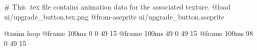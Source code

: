 # This .tex file contains animation data for the associated texture.
@load ui/upgrade_button.tex.png
@from-aseprite ui/upgrade_button.aseprite

@anim loop
	@frame 100ms 0 0 49 15
	@frame 100ms 49 0 49 15
	@frame 100ms 98 0 49 15

